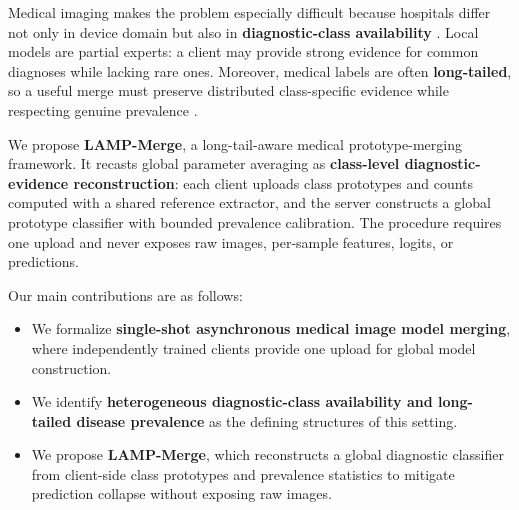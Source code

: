 \documentclass[letterpaper]{article} %
\begin{document}
Medical imaging makes the problem especially difficult because hospitals differ not only in device domain but also in \textbf{diagnostic-class availability} \cite{9557808,10.1371/journal.pmed.1002683,li2021fedbn}. Local models are partial experts: a client may provide strong evidence for common diagnoses while lacking rare ones. Moreover, medical labels are often \textbf{long-tailed}, so a useful merge must preserve distributed class-specific evidence while respecting genuine prevalence \cite{BUDA2018249,5597285}.

We propose \textbf{LAMP-Merge}, a long-tail-aware medical prototype-merging framework. It recasts global parameter averaging as \textbf{class-level diagnostic-evidence reconstruction}: each client uploads class prototypes and counts computed with a shared reference extractor, and the server constructs a global prototype classifier with bounded prevalence calibration. The procedure requires one upload and never exposes raw images, per-sample features, logits, or predictions.

Our main contributions are as follows:
\begin{itemize}
    \item We formalize \textbf{single-shot asynchronous medical image model merging}, where independently trained clients provide one upload for global model construction.
    \item We identify \textbf{heterogeneous diagnostic-class availability and long-tailed disease prevalence} as the defining structures of this setting.
    \item We propose \textbf{LAMP-Merge}, which reconstructs a global diagnostic classifier from client-side class prototypes and prevalence statistics to mitigate prediction collapse without exposing raw images.
\end{itemize}
\end{document}
